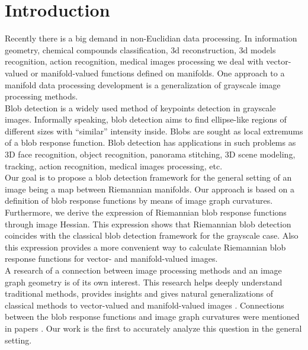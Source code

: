 \documentclass{llncs}
\begin{document}
\section{Introduction}
%
Recently there is a big demand in non-Euclidian data processing. In information geometry, chemical compounds classification, 3d reconstruction, 3d models recognition, action recognition, medical images processing we deal with vector-valued or manifold-valued functions defined on manifolds. One approach to a manifold data processing development is a generalization of grayscale image processing methods. 
\\
Blob detection \cite{blob} is a widely used method of keypoints detection in grayscale images. Informally speaking, blob detection aims to find ellipse-like regions of different sizes with “similar” intensity inside. Blobs are sought as local extremums of a blob response function. Blob detection has applications in such problems as 3D face recognition, object recognition, panorama stitching, 3D scene modeling, tracking, action recognition, medical images processing, etc.
\\
Our goal is to propose a blob detection framework for the general setting of an image being a map between Riemannian manifolds. Our approach is based on a definition of blob response functions by means of image graph curvatures. Furthermore, we derive the expression of Riemannian blob response functions through image Hessian. This expression shows that Riemannian blob detection coincides with the classical blob detection framework for the grayscale case. Also this expression provides a more convenient way to calculate Riemannian blob response functions for vector- and manifold-valued images.
\\
A research of a connection between image processing methods and an image graph geometry is of its own interest. This research helps deeply understand traditional methods, provides insights and gives natural generalizations of classical methods to vector-valued and manifold-valued images \cite{Saucan,Kimmel,Batard}. Connections between the blob response functions and image graph curvatures were mentioned in papers \cite{BlobCurv1,BlobCurv2}. Our work is the first to accurately analyze this question in the general setting.
\end{document}
